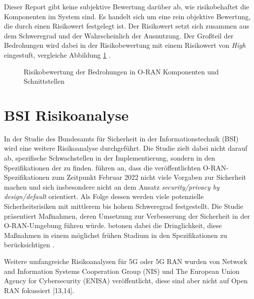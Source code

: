 \par Dieser Report gibt keine subjektive Bewertung darüber ab, wie risikobehaftet die Komponenten im System sind. Es handelt sich um eine rein objektive Bewertung, die durch einen Risikowert festgelegt ist. Der Risikowert setzt sich zusammen aus dem Schweregrad und der Wahrscheinlich der Ausnutzung. Der Großteil der Bedrohungen wird dabei in der Risikobewertung mit einem Risikowert von \textit{High} eingestuft, vergleiche Abbildung \ref{fig:riskscore-oran-components} \autocite{o-ranworkgroup11securityworkgroupORANSecurityThreat2024}.
%
\begin{figure}
    \centering
    \label{fig:riskscore-oran-components}
    \caption{Risikobewertung der Bedrohungen in O-RAN Komponenten und Schnittstellen}
\end{figure}
%

\section{BSI Risikoanalyse}
\label{sec:forschungsstand-bsi}
In der Studie des Bundesamts für Sicherheit in der Informationstechnik (BSI) wird eine weitere Risikoanalyse durchgeführt. Die Studie zielt dabei nicht darauf ab, spezifische Schwachstellen in der Implementierung, sondern in den Spezifikationen der \orana{} zu finden. \citeauthor{kopsellOpenRANRisikoanalyse2022} führen an, dass die veröffentlichten O-RAN-Spezifikationen zum Zeitpunkt Februar 2022 nicht viele Vorgaben zur Sicherheit machen und sich insbesondere nicht an dem Ansatz \textit{security/privacy by design/default} orientiert. Als Folge dessen werden viele potenzielle Sicherheitsrisiken mit mittlerem bis hohem Schweregrad festgestellt. Die Studie präsentiert Maßnahmen, deren Umsetzung zur Verbesserung der Sicherheit in der O-RAN-Umgebung führen würde. \citeauthor{kopsellOpenRANRisikoanalyse2022} betonen dabei die Dringlichkeit, diese Maßnahmen in einem möglichst frühen Stadium in den Spezifikationen zu berücksichtigen \autocite{kopsellOpenRANRisikoanalyse2022}.
\par Weitere umfangreiche Risikoanalysen für 5G oder 5G RAN wurden von Network
and Information Systems Cooperation Group (NIS) und The European Union
Agency for Cybersecurity (ENISA) veröffentlicht, diese sind aber nicht auf Open
RAN fokussiert [13,14].
%
